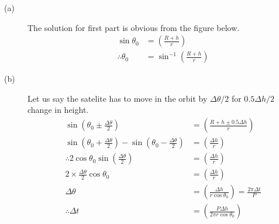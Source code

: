 \begin{description}
\item[(a)] The solution for first part is obvious from the figure below.
\begin{align*}
\sin\theta_0 &= \left(\frac{R + h}{r}\right) \\
\therefore \theta_0 &= \sin^{-1}\left(\frac{R + h}{r}\right)
\end{align*}

\item[(b)] Let us say the satelite %
has to move in the orbit by $\Delta\theta/2$ for $0.5\Delta h/2$ change in
height.
\begin{align*}
\sin\left(\theta_0 \pm \frac{\Delta\theta}{2}\right)
  &= \left(\frac{R + h \pm 0.5\Delta h}{r}\right) \\
\sin\left(\theta_0 + \frac{\Delta\theta}{2}\right)
  - \sin\left(\theta_0 - \frac{\Delta\theta}{2}\right)
  &= \left(\frac{\Delta h}{r}\right) \\
\therefore 2\cos\theta_0 \sin\left(\frac{\Delta\theta}{2}\right)
  &= \left(\frac{\Delta h}{r}\right) \\
2 \times \frac{\Delta\theta}{2}\cos\theta_0
  &= \left(\frac{\Delta h}{r}\right) \\
\Delta\theta &= \left(\frac{\Delta h}{r\cos\theta_0}\right)
  = \frac{2\pi\Delta t}{P} \\
\therefore \Delta t &= \left(\frac{P\Delta h}{2\pi r\cos\theta_0}\right)
\end{align*}


\end{description}
